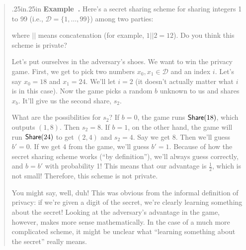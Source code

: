 \documentclass[12 pt]{article}
\def\D{\ensuremath{\mathcal{D}}}
\newcounter{example}[section]
\newenvironment{example}{\refstepcounter{example}\par\bigskip \begin{quotation}{}{\leftmargin .25in\rightmargin .25in}
    \noindent \textbf{Example~\thesection.\theexample }  \rmfamily}{\end{quotation}\par\bigskip}
\begin{document}
\begin{example}
    Here's a secret sharing scheme for sharing integers 1 to 99 (i.e., 
    $\D = \{1, \ldots, 99\}$) among two parties:
    \begin{pchstack}[center]
    \pchspace
    \end{pchstack}
    where $||$ means concatenation (for example, $1 || 2 = 12$). Do you 
    think this scheme is private?

    Let's put ourselves in the adversary's shoes. We want to win the 
    privacy game. First, we get to pick two numbers $x_0, x_1 \in \D$ and 
    an index $i$. Let's say $x_0 = 18$ and $x_1 = 24$. We'll let $i=2$ 
    (it doesn't actually matter what $i$ is in this case). Now the game 
    picks a random $b$ unknown to us and shares $x_b$. It'll give us the 
    second share, $s_2$. 
    
    What are the possibilities for $s_2$? If $b=0$, the game runs $\mathsf{Share}(18)$,
    which outputs $(1,8)$. Then $s_2 = 8$. If $b=1$, on the other hand, 
    the game will run $\mathsf{Share}(24)$ to get $(2,4)$ and $s_2 = 4$. Say 
    we get $8$. Then we'll guess $b' = 0$. If we get $4$ from the game, we'll 
    guess $b'=1$. Because of how the secret sharing scheme works (``by 
    definition''), we'll always guess correctly, and $b=b'$ with probability 
    1! This means that our advantage is $\frac{1}{2}$, which is not small!
    Therefore, this scheme is not private.

    You might say, well, duh! This was obvious from the informal definition 
    of privacy: if we're given a digit of the secret, we're clearly learning 
    something about the secret! Looking at the adversary's advantage in the 
    game, however, makes more sense mathematically. In the case of a much 
    more complicated scheme, it might be unclear what ``learning something 
    about the secret'' really means.
\end{example}
\end{document}
